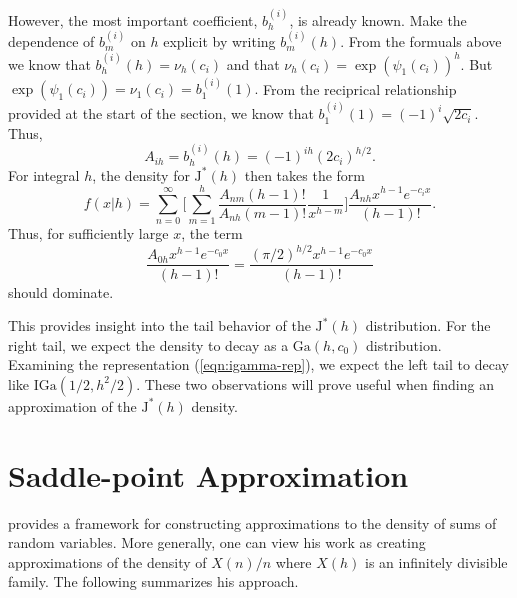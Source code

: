 \documentclass[12pt]{article}
\newcommand{\JJ}{\text{J}^*}
\newcommand{\Ga}{\mbox{Ga}}
\newcommand{\IGa}{\mbox{IGa}}
\begin{document}
However, the most important coefficient, $b_h^{(i)}$, is already known.  Make
the dependence of $b_m^{(i)}$ on $h$ explicit by writing $b_m^{(i)}(h)$.  From
the formuals above we know that \( b_h^{(i)}(h) = \nu_h(c_i) \) and that \(
\nu_h(c_i) = \exp(\psi_1(c_i))^h.  \) But \( \exp(\psi_1(c_i)) = \nu_1(c_i) =
b_1^{(i)}(1).  \) From the reciprical relationship provided at the start of the
section, we know that \( b_1^{(i)}(1) = (-1)^i \sqrt{2 c_i}.  \) Thus,
\[
A_{ih} = b_h^{(i)}(h) = (-1)^{ih} (2 c_i)^{h/2}.
\]
For integral $h$, the density for $\JJ(h)$ then takes the form
\[
f(x|h) = \sum_{n=0}^\infty
\Big[ \sum_{m=1}^h \frac{A_{nm} (h-1)! }{A_{nh} (m-1)!} \frac{1}{x^{h-m}} \Big]
\frac{A_{nh} x^{h-1} e^{-c_i x}}{(h-1)!}.
\]
Thus, for sufficiently large $x$, the term 
\[
\frac{A_{0h} x^{h-1} e^{-c_0 x}}{(h-1)!} = \frac{(\pi/2)^{h/2} x^{h-1} e^{-c_0 x}}{(h-1)!}
\]
should dominate.  

\begin{remark}
\label{remark:tails}
This provides insight into the tail behavior of the $\JJ(h)$ distribution.  For
the right tail, we expect the density to decay as a $\Ga(h,c_0)$ distribution.
Examining the representation (\ref{eqn:igamma-rep}), we expect the left tail to
decay like $\IGa(1/2, h^2/2)$.  These two observations will prove useful when
finding an approximation of the $\JJ(h)$ density.
\end{remark}


\section{Saddle-point Approximation}
\label{sec:largeb}

\cite{daniels-1954} provides a framework for constructing approximations to the
density of sums of random variables.  More generally, one can view his work as
creating approximations of the density of $X(n) / n$ where $X(h)$ is an
infinitely divisible family.  The following summarizes his approach.
\end{document}
